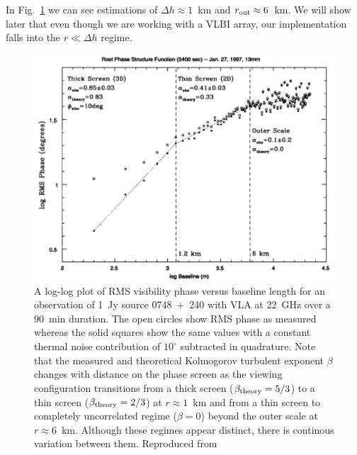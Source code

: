 In Fig.~\ref{fig:screentransition} we can see estimations of $\Delta h \approx 1$~km and $r_{\rm out} \approx 6$~km. We will show later that even though we are working with a VLBI array, our implementation falls into the $r \ll \Delta h$ regime.


\begin{figure}
\begin{center}
\includegraphics[width=\columnwidth]{Images/screentransition}
\caption[A log-log plot of RMS visibility phase versus baseline length for an observation of 1~Jy source.]{A log-log plot of RMS visibility phase versus baseline length for an observation of 1~Jy source 0748~+~240 with VLA at 22~GHz over a 90~min duration. The open circles show RMS phase as measured whereas the solid squares show the same values with a constant thermal noise contribution of $10^\circ$ subtracted in quadrature. Note that the measured and theoretical Kolmogorov turbulent exponent $\beta$ changes with distance on the phase screen as the viewing configuration transitions from a thick screen ($\beta_{\rm theory} = 5/3$) to a thin screen ($\beta_{\rm theory} = 2/3$) at $r \approx 1$~km and from a thin screen to completely uncorrelated regime ($\beta = 0$) beyond the outer scale at $r \approx 6$~km. Although these regimes appear distinct, there is continous variation between them. Reproduced from \citet*{Carilli_1997} \label{fig:screentransition}
}
\end{center}
\end{figure}

